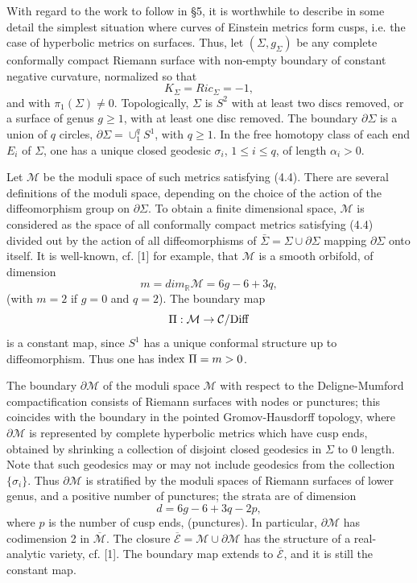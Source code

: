 \documentclass[11pt,amsfonts]{amsart}
\begin{document}
\medskip

 With regard to the work to follow in \S 5, it is worthwhile to 
describe in some detail the simplest situation where curves of Einstein 
metrics form cusps, i.e. the case of hyperbolic metrics on surfaces. 
Thus, let $(\Sigma, g_{\Sigma})$ be any complete conformally compact 
Riemann surface with non-empty boundary of constant negative curvature, 
normalized so that 
\begin{equation} \label{e4.4}
K_{\Sigma} = Ric_{\Sigma} = -1, 
\end{equation}
and with $\pi_{1}(\Sigma) \neq 0$. Topologically, $\Sigma$ is 
$S^{2}$ with at least two discs removed,  or a surface of genus $g \geq 1$, 
with at least one disc removed. The boundary $\partial\Sigma $ is 
a union of $q$ circles, $\partial\Sigma  = \cup_{1}^{q}S^{1}$, with 
$q \geq 1$. In the free homotopy class of each end $E_{i}$ of $\Sigma$, 
one has a unique closed geodesic $\sigma_{i}$, $1 \leq  i \leq q$, 
of length $\alpha_{i} > 0$. 

 Let ${\mathcal M}$ be the moduli space of such metrics satisfying (4.4). 
There are several definitions of the moduli space, depending on the 
choice of the action of the diffeomorphism group on $\partial\Sigma$. 
To obtain a finite dimensional space, ${\mathcal M}$ is considered as the 
space of all conformally compact metrics satisfying (4.4) divided out 
by the action of all diffeomorphisms of $\bar \Sigma = 
\Sigma\cup\partial\Sigma$ mapping $\partial\Sigma$ onto itself. It is 
well-known, cf. [1] for example, that ${\mathcal M}$ is a smooth 
orbifold, of dimension
\begin{equation} \label{e4.5}
m = dim_{{\mathbb R}}{\mathcal M} = 6g-6+3q, 
\end{equation}
(with $m = 2$ if $g = 0$ and $q = 2$). The boundary map
\begin{equation} \label{e4.6}
\Pi: {\mathcal M}  \rightarrow  {\mathcal C} /{\rm Diff} 
\end{equation}
is a constant map, since $S^{1}$ has a unique conformal structure up to 
diffeomorphism. Thus one has ${\rm index} \ \Pi = m > 0$. 

 The boundary $\partial{\mathcal M}$ of the moduli space ${\mathcal M}$ with 
respect to the Deligne-Mumford compactification consists of Riemann 
surfaces with nodes or punctures; this coincides with the boundary in 
the pointed Gromov-Hausdorff topology, where $\partial{\mathcal M}$ is 
represented by complete hyperbolic metrics which have cusp ends, 
obtained by shrinking a collection of disjoint closed geodesics in 
$\Sigma$ to 0 length. Note that such geodesics may or may not include 
geodesics from the collection $\{\sigma_{i}\}$. Thus $\partial{\mathcal M}$ 
is stratified by the moduli spaces of Riemann surfaces of lower genus, and 
a positive number of punctures; the strata are of dimension 
$$d = 6g-6+3q-2p, $$
where $p$ is the number of cusp ends, (punctures). In particular, 
$\partial{\mathcal M} $ has codimension 2 in $\overline{\mathcal M}$. The 
closure $\overline{\mathcal E} = {\mathcal M}\cup\partial{\mathcal M}$ 
has the structure of a real-analytic variety, cf. [1]. The boundary map 
extends to $\overline{\mathcal E}$, and it is still the constant map.
\end{document}
